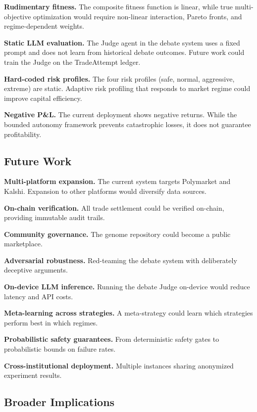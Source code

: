 \textbf{Rudimentary fitness.} The composite fitness function is linear, while true multi-objective optimization would require non-linear interaction, Pareto fronts, and regime-dependent weights.

\textbf{Static LLM evaluation.} The Judge agent in the debate system uses a fixed prompt and does not learn from historical debate outcomes. Future work could train the Judge on the TradeAttempt ledger.

\textbf{Hard-coded risk profiles.} The four risk profiles (safe, normal, aggressive, extreme) are static. Adaptive risk profiling that responds to market regime could improve capital efficiency.

\textbf{Negative P\&L.} The current deployment shows negative returns. While the bounded autonomy framework prevents catastrophic losses, it does not guarantee profitability.

\subsection{Future Work}

\textbf{Multi-platform expansion.} The current system targets Polymarket and Kalshi. Expansion to other platforms would diversify data sources.

\textbf{On-chain verification.} All trade settlement could be verified on-chain, providing immutable audit trails.

\textbf{Community governance.} The genome repository could become a public marketplace.

\textbf{Adversarial robustness.} Red-teaming the debate system with deliberately deceptive arguments.

\textbf{On-device LLM inference.} Running the debate Judge on-device would reduce latency and API costs.

\textbf{Meta-learning across strategies.} A meta-strategy could learn which strategies perform best in which regimes.

\textbf{Probabilistic safety guarantees.} From deterministic safety gates to probabilistic bounds on failure rates.

\textbf{Cross-institutional deployment.} Multiple instances sharing anonymized experiment results.

\subsection{Broader Implications}

